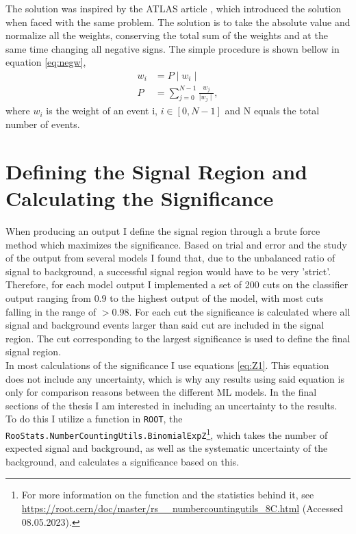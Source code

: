 The solution was inspired by the \ac{ATLAS} article \cite{Aad:2800889}, which introduced the solution 
when faced with the same problem. The solution is to take the absolute value and normalize all the weights, 
conserving the total sum of the weights and at the same time changing all negative signs. The simple procedure 
is shown bellow in equation \ref{eq:negw},
\begin{align}\label{eq:negw}
    w_i & = P \mid w_i \mid\,  \\
    P  & =  \sum_{j=0}^{N-1}\frac{ w_j}{\mid w_j \mid},
\end{align}
where $w_i$ is the weight of an event i, $i \in [0,N-1]$ and N equals the total number of events.
\section{Defining the Signal Region and Calculating the Significance}\label{sec:calcSign}
When producing an output I define the signal region through a brute force method which maximizes the significance. 
Based on trial and error and the study of the output from several models I found that, due to the unbalanced ratio of 
signal to background, a successful signal region would have to be very 'strict'. Therefore, for each model output I implemented a 
set of 200 cuts on the classifier output ranging from $0.9$ to the highest output of the model, with most cuts falling in the range of $>0.98$. For each cut
the significance is calculated where all signal and background events larger than said cut are included in the signal region. The cut 
corresponding to the largest significance is used to define the final signal region.  
\\
In most calculations of the significance I use equations \ref{eq:Z1}. This equation does not include any 
uncertainty, which is why any results using said equation is only for comparison reasons between the different \ac{ML}
models. In the final sections of the thesis I am interested in including an uncertainty to the results. To do this I utilize 
a function in \verb!ROOT!, the \texttt{RooStats.NumberCountingUtils.BinomialExpZ}\footnote{For more information on the function and the 
statistics behind it, see \url{https://root.cern/doc/master/rs__numbercountingutils_8C.html} (Accessed 08.05.2023).}, which takes the number of expected signal and background, 
as well as the systematic uncertainty of the background, and calculates a significance based on this.